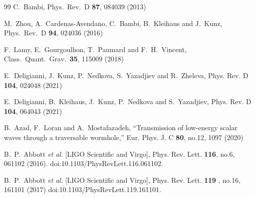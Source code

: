 \documentclass[a4paper,12pt]{article}
\begin{document}
\begin{thebibliography}{99}
  C.~Bambi,
  Phys.\ Rev.\ D {\bf 87}, 084039 (2013)

  M.~Zhou, A.~Cardenas-Avendano, C.~Bambi, B.~Kleihaus and J.~Kunz,
  Phys.\ Rev.\ D {\bf 94}, 024036 (2016)

  F.~Lamy, E.~Gourgoulhon, T.~Paumard and F.~H.~Vincent,
  Class.\ Quant.\ Grav.\  {\bf 35},   115009 (2018)

E.~Deligianni, J.~Kunz, P.~Nedkova, S.~Yazadjiev and R.~Zheleva,
Phys. Rev. D \textbf{104},  024048 (2021)

E.~Deligianni, B.~Kleihaus, J.~Kunz, P.~Nedkova and S.~Yazadjiev,
Phys. Rev. D \textbf{104},  064043 (2021)

B.~Azad, F.~Loran and A.~Mostafazadeh,
``Transmission of low-energy scalar waves through a traversable wormhole,''
Eur. Phys. J. C \textbf{80}, no.12, 1097 (2020)

B.~P.~Abbott \textit{et al.} [LIGO Scientific and Virgo],
Phys. Rev. Lett. \textbf{116}, no.6, 061102 (2016).
doi:10.1103/PhysRevLett.116.061102.

B.~P.~Abbott \textit{et al.} [LIGO Scientific and Virgo],
Phys. Rev. Lett. \textbf{119} , no.16, 161101 (2017)
doi:10.1103/PhysRevLett.119.161101.


\end{thebibliography}
\end{document}
